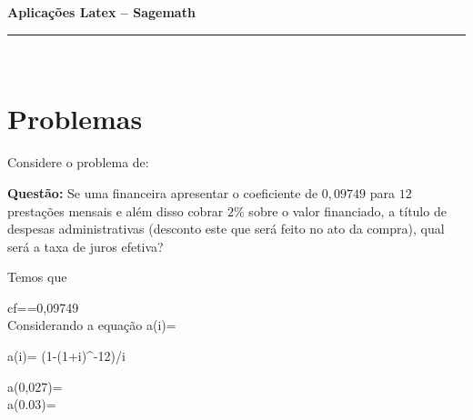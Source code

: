 \documentclass[11pt,a4paper]{article}
\newcommand{\nomer}{\bf Aplicações  Latex -- Sagemath}
\begin{document}
\Large
\large
\begin{center}
\noindent  \nomer
\end{center}
\hfill   %
\hrule\ 
\section*{\sc Problemas}
Considere o problema de\cite{fina2007mathias}:
 


{\bf Questão: }Se uma financeira apresentar o coeficiente de $0,09749$ para $12$ prestações mensais e além disso cobrar $2\%$ sobre o valor financiado, a título de despesas administrativas (desconto este que será feito no ato da compra), qual será a taxa de juros efetiva?

{\sol Temos que}

\ben
cf==0,09749\\
\een
Considerando a equação
\ben
a(i)= 
\een
\begin{sagesilent}
a(i)= (1-(1+i)^-12)/i
\end{sagesilent}


\ben
a(0,027)=\\
a(0.03)=\\
\een

\printbibliography
\end{document}
